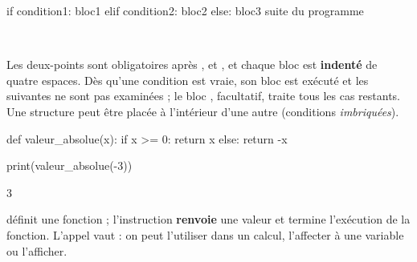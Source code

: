 
\noindent
\begin{minipage}[c]{0.44\linewidth}
\begin{python}
if condition1:
    bloc1
elif condition2:
    bloc2
else:
    bloc3
suite du programme
\end{python}
\end{minipage}\hfill
\begin{minipage}[c]{0.52\linewidth}
\centering
{}\\[0.5mm]
\end{minipage}

\begin{propriete}
Les deux-points \code{:} sont obligatoires après ,  et , et chaque bloc est \textbf{indenté} de quatre
espaces. Dès qu'une condition est vraie, son bloc est exécuté et les suivantes ne sont pas examinées ; le bloc , facultatif,
traite tous les cas restants. Une structure peut être placée à l'intérieur d'une autre (conditions \emph{imbriquées}).
\end{propriete}


\noindent
\begin{minipage}[c]{0.48\linewidth}
\begin{python}
def valeur_absolue(x):
    if x >= 0:
        return x
    else:
        return -x

print(valeur_absolue(-3))
\end{python}
\begin{console}
3
\end{console}
\end{minipage}\hfill
\begin{minipage}[c]{0.48\linewidth}
\begin{definition}[Fonction]
\raggedright
{} définit une fonction ; l'instruction  \textbf{renvoie} une valeur et termine l'exécution de la
fonction. L'appel  vaut  : on peut l'utiliser dans un calcul, l'affecter à une variable ou l'afficher.
\end{definition}
\end{minipage}

